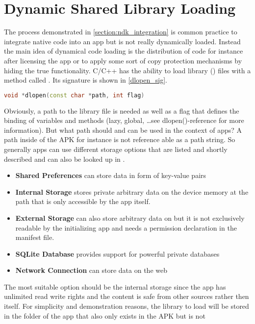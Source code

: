 \section{Dynamic Shared Library Loading}\label{section:shared_library_loading}
The process demonstrated in \autoref{section:ndk_integration} is common practice to 
integrate native code into an app but is not really dynamically loaded. Instead
the main idea of dynamical code loading is the distribution of code for instance
after licensing the app or to apply some sort of copy protection mechanisms by hiding
the true functionality.
C/C++ has the ability to load library () files with a method called
. Its signature is shown in \autoref{dlopen_sig}.
\begin{lstlisting}[language=C++, caption=dlopen() Signature, label=dlopen_sig]
void *dlopen(const char *path, int flag)
\end{lstlisting}
Obviously, a path to the library file is needed as well as a flag that defines the binding of variables and methods (lazy, global, \ldots see dlopen()-reference for more information).
But what path should and can be used in the context of apps? A path inside of the APK
for instance is not reference able as a path string. So generally apps can use different storage options that are listed and shortly described and can also be looked up in
\parencite{storage_options}.
\begin{itemize}
\item \textbf{Shared Preferences} can store data in form of key-value pairs
\item \textbf{Internal Storage} stores private arbitrary data on the device memory at the path
  that is only accessible by the app itself.
\item \textbf{External Storage} can also store arbitrary data on  but it is not exclusively readable by the initializing app and needs a permission declaration in
the manifest file.
\item \textbf{SQLite Database} provides support for powerful private databases
\item \textbf{Network Connection} can store data on the web 
\end{itemize}
The most suitable option should be the internal storage since the app has unlimited read
write rights and the content is safe from other sources rather then itself. For simplicity and demonstration reasons, the library to load will be stored in the
 folder of the app that also only exists in the APK but is not 
